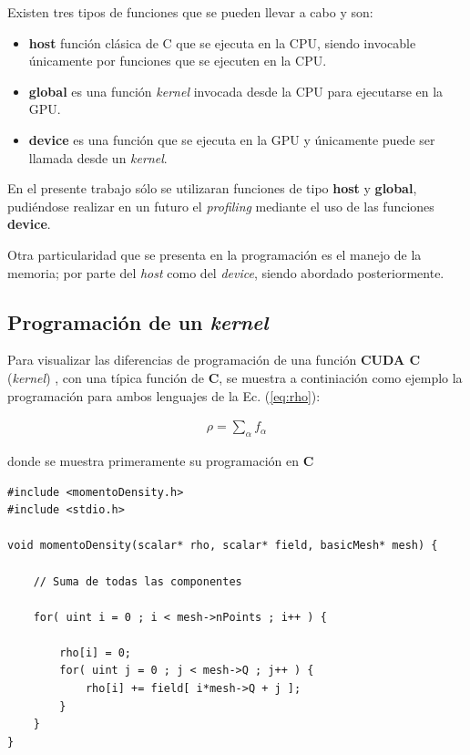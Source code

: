 Existen tres tipos de funciones que se pueden llevar a cabo y son:

\begin{itemize}
	
	\item \textbf{host} función clásica de C que se ejecuta en la CPU, siendo invocable únicamente por funciones que se ejecuten en la CPU. 

	\item \textbf{global} es una función \textit{kernel} invocada desde la CPU para ejecutarse en la GPU. 
	
	\item \textbf{device} es una función que se ejecuta en la GPU y únicamente puede ser llamada desde un \textit{kernel}.
	
\end{itemize}

En el presente trabajo sólo se utilizaran funciones de tipo \textbf{host} y \textbf{global}, pudiéndose realizar en un futuro el  \textit{profiling} mediante el uso de las funciones \textbf{device}.

Otra particularidad que se presenta en la programación es el manejo de la memoria; por parte del \textit{host} como del \textit{device}, siendo abordado posteriormente.
\newpage

\subsection{Programación de un \textit{kernel}}

Para visualizar las diferencias de programación de una función \textbf{CUDA C } (\textit{kernel}) , con una típica función de \textbf{C}, se muestra a continiación como ejemplo la programación para ambos lenguajes de la Ec. (\ref{eq:rho}): 

\begin{align*}
	\rho = \sum_{\alpha} f_{\alpha}
\end{align*}

donde se muestra primeramente su programación en \textbf{C}

{\footnotesize
	\begin{frame}{}
		\begin{lstlisting}[frame=single]
#include <momentoDensity.h>
#include <stdio.h>

void momentoDensity(scalar* rho, scalar* field, basicMesh* mesh) {
	
	// Suma de todas las componentes
	
	for( uint i = 0 ; i < mesh->nPoints ; i++ ) {
		
		rho[i] = 0;	    
		for( uint j = 0 ; j < mesh->Q ; j++ ) {
			rho[i] += field[ i*mesh->Q + j ];
		}		
	}
}
		\end{lstlisting}
		
	\end{frame}
}

